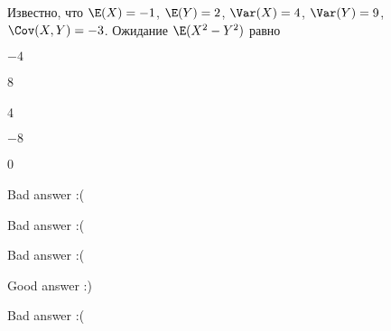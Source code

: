 
\begin{question}
Известно, что \(\E(X)=-1\), \(\E(Y)=2\), \(\Var(X)=4\), \(\Var(Y)=9\),
\(\Cov(X,Y)=-3\). Ожидание \(\E(X^2-Y^2)\) равно
\begin{answerlist}
  \item \(-4\)
  \item 8
  \item 4
  \item \(-8\)
  \item 0
\end{answerlist}
\end{question}

\begin{solution}
\begin{answerlist}
  \item Bad answer :(
  \item Bad answer :(
  \item Bad answer :(
  \item Good answer :)
  \item Bad answer :(
\end{answerlist}
\end{solution}

